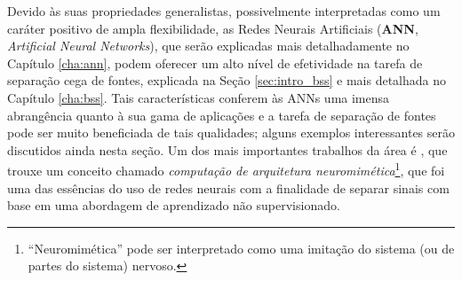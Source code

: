 Devido às suas propriedades generalistas, possivelmente interpretadas como um caráter positivo de ampla flexibilidade, as Redes Neurais Artificiais (\textbf{ANN}, \textit{Artificial Neural Networks}), que serão explicadas mais detalhadamente no Capítulo \ref{cha:ann}, podem oferecer um alto nível de efetividade na tarefa de separação cega de fontes, explicada na Seção \ref{sec:intro_bss} e mais detalhada no Capítulo \ref{cha:bss}. Tais características conferem às ANNs uma imensa abrangência quanto à sua gama de aplicações e a tarefa de separação de fontes pode ser muito beneficiada de tais qualidades; alguns exemplos interessantes serão discutidos ainda nesta seção. Um dos mais importantes trabalhos da área é \citep{herault1985detection}, que trouxe um conceito chamado \textit{computação de arquitetura neuromimética}\footnote{``Neuromimética'' pode ser interpretado como uma imitação do sistema (ou de partes do sistema) nervoso.}, que foi uma das essências do uso de redes neurais com a finalidade de separar sinais com base em uma abordagem de aprendizado não supervisionado.








